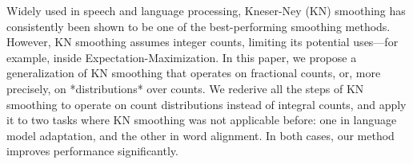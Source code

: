 Widely used in speech and language processing, Kneser-Ney (KN) smoothing has consistently been shown to be one of the best-performing smoothing methods. However, KN smoothing assumes integer counts, limiting its potential uses---for example, inside Expectation-Maximization. In this paper, we propose a generalization of KN smoothing that operates on fractional counts, or, more precisely, on *distributions* over counts. We rederive all the steps of KN smoothing to operate on count distributions instead of integral counts, and apply it  to two tasks where KN smoothing was not applicable before: one in language model adaptation, and the other in word alignment. In both cases, our method improves performance significantly.

